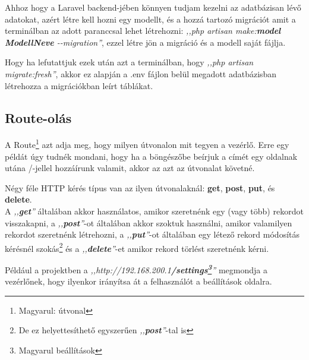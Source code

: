 \documentclass[
]{thesis-ekf}
\theoremstyle{definition}
\theoremstyle{remark}
\begin{document}
	Ahhoz hogy a Laravel backend-jében könnyen tudjam kezelni az adatbázisan lévő adatokat, azért létre kell hozni egy modellt, és a hozzá tartozó migrációt amit a terminálban az adott paranccsal lehet létrehozni: \emph{,,php artisan make:\textbf{model} \textbf{ModellNeve} \--\--migration''}, ezzel létre jön a migráció és a modell saját fájlja.
	
	
	Hogy ha lefutattjuk ezek után azt a terminálban, hogy \emph{,,php artisan migrate:fresh''}, akkor ez alapján a .env fájlon belül megadott adatbázisban létrehozza a migrációkban leírt táblákat.
	
	\subsection{Route-olás}
	A Route\footnote{Magyarul: útvonal} azt adja meg, hogy milyen útvonalon mit tegyen a vezérlő. Erre egy példát úgy tudnék mondani, hogy ha a böngészőbe beírjuk a címét egy oldalnak utána /-jellel hozzáírunk valamit, akkor az azt az útvonalat követné.
	
	Négy féle HTTP kérés típus van az ilyen útvonalaknál: \textbf{get}, \textbf{post}, \textbf{put}, és \textbf{delete}.\\
	A \emph{,,\textbf{get}''} általában akkor használatos, amikor szeretnénk egy (vagy több) rekordot visszakapni, a \emph{,,\textbf{post}''}-ot általában akkor szoktuk használni, amikor valamilyen rekordot szeretnénk létrehozni, a \emph{,,\textbf{put}''}-ot általában egy létező rekord módosítás kérésnél szokás\footnote{De ez helyettesíthető egyszerűen \emph{,,\textbf{post}''}-tal is} és a \emph{,,\textbf{delete}''}-et amikor rekord törlést szeretnénk kérni.
	
	Például a projektben a \emph{,,http://192.168.200.1\textbf{/settings\footnote{Magyarul beállítások}}''} megmondja a vezérlőnek, hogy ilyenkor irányítsa át a felhasználót a beállítások oldalra.
	
\end{document}

